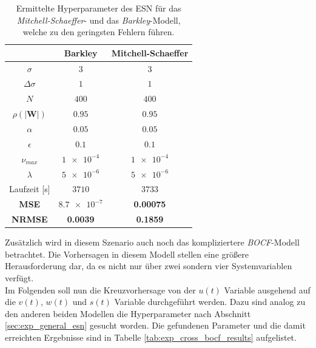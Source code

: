 \begin{table}[h]
	\centering
	\captionsetup{width=0.9\linewidth}
	\begin{tabular}{ccc}
		\hline		
		\multicolumn{1}{c}{} &  Barkley & Mitchell-Schaeffer \\ 
		\hline 
		\rule[-1ex]{0pt}{2.5ex} $\sigma$ & $3$ & $3$ \\ 
		\rule[-1ex]{0pt}{2.5ex} $\Delta \sigma$ & $1$ & $1$ \\ 
		\rule[-1ex]{0pt}{3.5ex} $N$ & $400$ & $400$ \\ 
		\rule[-1ex]{0pt}{3.5ex} $\rho(|\mathbf{W}|)$ & $0.95$ & $0.95$\\ 
		\rule[-1ex]{0pt}{3.5ex} $\alpha$ & $0.05$ & $0.05$ \\ 
		\rule[-1ex]{0pt}{3.5ex} $\epsilon$ & $0.1$ & $0.1$ \\ 
		\rule[-1ex]{0pt}{3.5ex} $\nu_{max}$ & $\num{1e-4}$ & $\num{1e-4}$\\ 
		\rule[-1ex]{0pt}{3.5ex} $\lambda$ & $\num{5e-6}$ & $\num{5e-6}$\\ 
		\rule[-1ex]{0pt}{2.5ex} Laufzeit [s] & $3710$ & $3733$ \\ 
		\rule[-1ex]{0pt}{2.5ex} \textbf{MSE} & \textbf{$\num{8.7e-7}$} & \textbf{0.00075} \\ 
		\rule[-1ex]{0pt}{2.5ex} \textbf{NRMSE} & \textbf{0.0039} & \textbf{0.1859} \\ 
		\hline 
	\end{tabular} 
	\caption{Ermittelte Hyperparameter des \textsc{ESN} für das \textit{Mitchell-Schaeffer}- und das \textit{Barkley}-Modell, welche zu den geringsten Fehlern führen.}
	\label{tab:exp_cross_esn_results}
\end{table}

Zusätzlich wird in diesem Szenario auch noch das kompliziertere \textit{BOCF}-Modell betrachtet. Die Vorhersagen in diesem Modell stellen eine größere Herausforderung dar, da es nicht nur über zwei sondern vier Systemvariablen verfügt.\\
Im Folgenden soll nun die Kreuzvorhersage von der $u(t)$ Variable ausgehend auf die $v(t)$, $w(t)$ und $s(t)$ Variable durchgeführt werden. Dazu sind analog zu den anderen beiden Modellen die Hyperparameter nach Abschnitt \ref{sec:exp_general_esn} gesucht worden. Die gefundenen Parameter und die damit erreichten Ergebnisse sind in Tabelle \ref{tab:exp_cross_bocf_results} aufgelistet. \\

